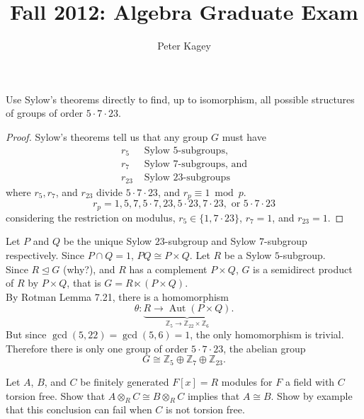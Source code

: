 \documentclass{article}
\newenvironment{problem}[2][Problem]{\begin{trivlist}
\item[\hskip \labelsep {\bfseries #1}\hskip \labelsep {\bfseries #2.}]}{\end{trivlist}}
\newcommand{\Z}{\mathbb Z}
\newcommand{\normalsubgroup}{\trianglelefteq}
\begin{document}
\title{Fall 2012: Algebra Graduate Exam}
\author{Peter Kagey}

\maketitle

\begin{problem}{1}
  Use Sylow's theorems directly to find, up to isomorphism, all possible structures of groups of order $5 \cdot 7 \cdot 23$.
\end{problem}

\begin{proof}
  Sylow's theorems tell us that any group $G$ must have \begin{align*}
    r_5 &\text{ Sylow } 5\text{-subgroups,} \\
    r_7 &\text{ Sylow } 7\text{-subgroups, and} \\
    r_{23} &\text{ Sylow } 23\text{-subgroups}
  \end{align*} where $r_5, r_7$, and $r_{23}$ divide $5 \cdot 7 \cdot 23$, and $r_p \equiv 1 \bmod p$. \[
    r_p = 1, 5, 7, 5 \cdot 7, 23, 5 \cdot 23, 7 \cdot 23, \text{ or } 5 \cdot 7 \cdot 23
  \] considering the restriction on modulus,
    $r_5 \in \{1, 7 \cdot 23\}$,
    $r_7 = 1$, and
    $r_{23} = 1$.
\end{proof} Let $P$ and $Q$ be the unique Sylow $23$-subgroup and Sylow
$7$-subgroup respectively.
Since $P \cap Q = 1$, $PQ \cong P \times Q$. Let $R$ be a Sylow $5$-subgroup.
\\
Since $R \normalsubgroup G$ (why?), and $R$ has a complement $P \times Q$, $G$ is a
semidirect product of $R$ by $P \times Q$, that is $G = R \ltimes (P \times Q)$.
\\
By Rotman Lemma 7.21, there is a homomorphism \[
  \theta\colon \underbrace{
    R \rightarrow \operatorname{Aut}(P \times Q)
  }_{\Z_5 \rightarrow \Z_{22} \times \Z_6}.
\]
But since $\gcd(5, 22) = \gcd(5, 6) = 1$, the only homomorphism is trivial.
Therefore there is only one group of order $5 \cdot 7 \cdot 23$, the abelian
group \[
  G \cong \Z_5 \oplus \Z_7 \oplus \Z_{23}.
\]
\pagebreak

\begin{problem}{2}
  Let $A$, $B$, and $C$ be finitely generated $F[x] = R$ modules for $F$ a field
  with $C$ torsion free. Show that $A \otimes_R C \cong B \otimes_R C$ implies
  that $A \cong B$.
  Show by example that this conclusion can fail when $C$ is not torsion free.
\end{problem}
\end{document}
